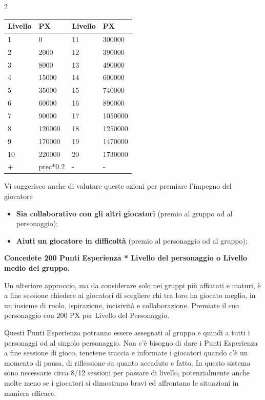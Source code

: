 \begin{multicols}{2}
\noindent\begin{tabularx}{\linewidth}{lX|lX}
	\toprule
 \rowcolor{gray!20}\textbf{Livello} & \textbf{PX}&\textbf{Livello} & \textbf{PX}\\
	\toprule
	1&0&11&300000\\
 \rowcolor{gray!20}2&2000&12&390000\\
	3&8000&13&490000\\
 \rowcolor{gray!20}4&15000&14&600000\\
	5&35000&15&740000\\
 \rowcolor{gray!20}6&60000&16&890000\\
	7&90000&17&1050000\\
 \rowcolor{gray!20}8&120000&18&1250000\\
	9&170000&19&1470000\\
 \rowcolor{gray!20}10&220000&20&1730000\\
	+&prec*0.2&-&-\\
\end{tabularx}

\medskip

Vi suggerisco anche di valutare queste azioni per premiare l'impegno del giocatore
\begin{itemize}[leftmargin=*] \setlength{\itemsep}{0pt}
\item \textbf{Sia collaborativo con gli altri giocatori} (premio al gruppo od al personaggio);
\item \textbf{Aiuti un giocatore in difficoltà} (premio al personaggio od al gruppo);
\end{itemize}

\medskip

\textbf{Concedete 200 Punti Esperienza * Livello del personaggio o Livello medio del gruppo.}

\medskip


Un ulteriore approccio, ma da considerare solo nei gruppi più affiatati e maturi, è a fine sessione chiedere ai giocatori di scegliere chi tra loro ha giocato meglio, in un insieme di ruolo, ispirazione, incisività e collaborazione. Premiate il suo personaggio con 200 PX per Livello del Personaggio.

Questi Punti Esperienza potranno essere assegnati al gruppo e quindi a tutti i personaggi od al singolo personaggio.
Non c'è bisogno di dare i Punti Esperienza a fine sessione di gioco, tenetene traccia e informate i giocatori quando c'è un momento di pausa, di riflessione su quanto accaduto e fatto.
In questo sistema sono necessarie circa 8/12 sessioni per passare di livello, potenzialmente anche molte meno se i giocatori si dimostrano bravi ed affrontano le situazioni in maniera efficace.


\end{multicols}
